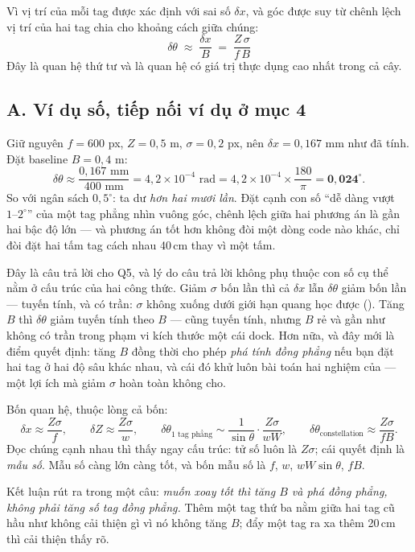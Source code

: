 \documentclass[../../marker.tex]{subfiles}
\begin{document}
Vì vị trí của mỗi tag được xác định với sai số \(\delta x\), và góc được suy từ chênh lệch vị trí của hai tag chia cho khoảng cách giữa chúng:
\begin{equation}
\boxed{\;\delta\theta \;\approx\; \frac{\delta x}{B} \;=\; \frac{Z\,\sigma}{f\,B}\;}
\label{eq:a05-baseline}
\end{equation}
Đây là quan hệ thứ tư và là quan hệ có giá trị thực dụng cao nhất trong cả cây.

\subsection{A. Ví dụ số, tiếp nối ví dụ ở mục 4}

Giữ nguyên \(f = 600\) px, \(Z = 0{,}5\) m, \(\sigma = 0{,}2\) px, nên \(\delta x = 0{,}167\) mm như đã tính. Đặt baseline \(B = 0{,}4\) m:
\[
\delta\theta \approx \frac{0{,}167\text{ mm}}{400\text{ mm}} = 4{,}2\times10^{-4}\text{ rad}
= 4{,}2\times10^{-4} \times \frac{180}{\pi} = \mathbf{0{,}024^\circ}.
\]
So với ngân sách \(0{,}5^\circ\): ta dư \emph{hơn hai mươi lần}. Đặt cạnh con số ``dễ dàng vượt \(1\text{--}2^\circ\)'' của một tag phẳng nhìn vuông góc, chênh lệch giữa hai phương án là gần hai bậc độ lớn --- và phương án tốt hơn không đòi một dòng code nào khác, chỉ đòi đặt hai tấm tag cách nhau 40\,cm thay vì một tấm.

Đây là câu trả lời cho Q5, và lý do câu trả lời không phụ thuộc con số cụ thể nằm ở cấu trúc của hai công thức. Giảm \(\sigma\) bốn lần thì cả \(\delta x\) lẫn \(\delta\theta\) giảm bốn lần --- tuyến tính, và có trần: \(\sigma\) không xuống dưới giới hạn quang học được (). Tăng \(B\) thì \(\delta\theta\) giảm tuyến tính theo \(B\) --- cũng tuyến tính, nhưng \(B\) rẻ và gần như không có trần trong phạm vi kích thước một cái dock. Hơn nữa, và đây mới là điểm quyết định: tăng \(B\) đồng thời cho phép \emph{phá tính đồng phẳng} nếu bạn đặt hai tag ở hai độ sâu khác nhau, và cái đó khử luôn bài toán hai nghiệm của  --- một lợi ích mà giảm \(\sigma\) hoàn toàn không cho.

\begin{cannho}
Bốn quan hệ, thuộc lòng cả bốn:
\[
\delta x \approx \frac{Z\sigma}{f}, \qquad
\delta Z \approx \frac{Z\sigma}{w}, \qquad
\delta\theta_{\text{1 tag phẳng}} \sim \frac{1}{\sin\theta}\cdot\frac{Z\sigma}{wW}, \qquad
\delta\theta_{\text{constellation}} \approx \frac{Z\sigma}{fB}.
\]
Đọc chúng cạnh nhau thì thấy ngay cấu trúc: tử số luôn là \(Z\sigma\); cái quyết định là \emph{mẫu số}. Mẫu số càng lớn càng tốt, và bốn mẫu số là \(f\), \(w\), \(wW\sin\theta\), \(fB\).

Kết luận rút ra trong một câu: \emph{muốn xoay tốt thì tăng \(B\) và phá đồng phẳng, không phải tăng số tag đồng phẳng.} Thêm một tag thứ ba nằm giữa hai tag cũ hầu như không cải thiện gì vì nó không tăng \(B\); đẩy một tag ra xa thêm 20\,cm thì cải thiện thấy rõ.
\end{cannho}
\end{document}
